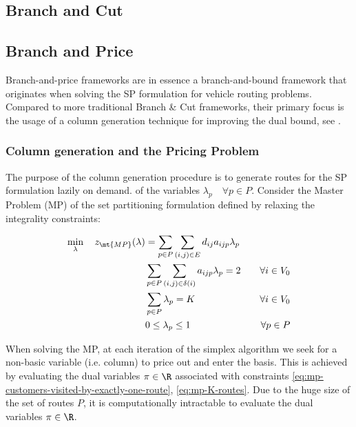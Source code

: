 \subsection{Branch and Cut}

\subsection{Branch and Price}
Branch-and-price frameworks are in essence a branch-and-bound framework that originates when solving the SP formulation for vehicle routing problems.
Compared to more traditional Branch \& Cut frameworks, their primary focus is the usage of a column generation technique for improving the dual bound, see \textcite{righini2008new}.

\subsubsection{Column generation and the Pricing Problem}
The purpose of the column generation procedure is to generate routes for the SP formulation lazily on demand.
of the variables $\lambda_p \quad \forall p \in P$.
Consider the Master Problem (MP) of the set partitioning formulation defined by relaxing the integrality constraints:

\begin{align}
	\min_{\lambda} \quad z_\mt{MP}(\lambda) & = \sum_{p \in P} \sum_{(i, j) \in E} d_{ij} a_{ijp} \lambda_p \label{eq:mp-obj-func}                                                                                                                             \\
	                                        & \sum_{p \in P} \sum_{(i, j) \in \delta(i)} a_{ijp} \lambda_p = 2                     & \quad \forall i \in V_0                                              \label{eq:mp-customers-visited-by-exactly-one-route} \\
	                                        & \sum_{p \in P} \lambda_{p} = K                                                       & \quad \forall i \in V_0                                              \label{eq:mp-K-routes}                               \\
	                                        & 0 \le \lambda_p \le 1                                                                & \quad \forall p \in P \label{eq:mp-lambda-mip-var-bounds}
\end{align}


When solving the MP, at each iteration of the simplex algorithm we seek for a non-basic variable (i.e. column) to price out and enter the basis.
This is achieved by evaluating the dual variables $\pi \in \R$ associated with constraints \eqref{eq:mp-customers-visited-by-exactly-one-route}, \eqref{eq:mp-K-routes}.
Due to the huge size of the set of routes $P$, it is computationally intractable to evaluate the dual variables $\pi \in \R$.

